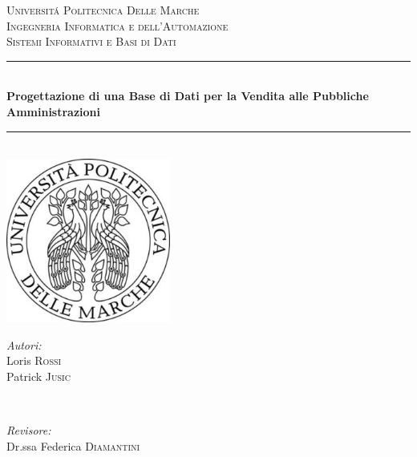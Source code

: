 
\begin{titlepage}

\newcommand{\HRule}{\rule{\linewidth}{0.5mm}} %

\center %

\textsc{\LARGE Universit\'{a} Politecnica Delle Marche}\\[1.5cm] %
\textsc{\Large Ingegneria Informatica e dell'Automazione}\\[0.5cm] %
\textsc{\large Sistemi Informativi e Basi di Dati}\\[0.5cm] %

\HRule \\[0.4cm]
{ \huge \bfseries Progettazione di una Base di Dati per la Vendita alle Pubbliche Amministrazioni}\\[0.4cm] %
\HRule \\[1.5cm]

\includegraphics[width=54mm, height=54mm]{./immagini/logo}\\[1cm] %

\begin{minipage}{0.4\textwidth}
\begin{flushleft} \large
\emph{Autori:}\\
Loris \textsc{Rossi}\\ %
Patrick \textsc{Jusic}\\ %
\end{flushleft}
\end{minipage}
~
\begin{minipage}{0.4\textwidth}
\begin{flushright} \large
\emph{Revisore:} \\
Dr.ssa Federica \textsc{Diamantini} %
\end{flushright}
\end{minipage}\\[1.5cm]





\vfill %

\end{titlepage}